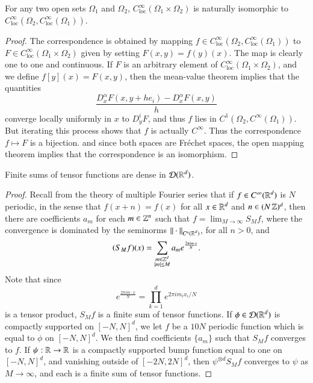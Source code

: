 \begin{theorem}
    For any two open sets $\Omega_1$ and $\Omega_2$, $C^\infty_{\text{loc}}(\Omega_1 \times \Omega_2)$ is naturally isomorphic to $C^\infty_{\text{loc}}(\Omega_2, C^\infty_{\text{loc}}(\Omega_1))$.
\end{theorem}
\begin{proof}
    The correspondence is obtained by mapping $f \in C^\infty_{\text{loc}}(\Omega_2, C^\infty_{\text{loc}}(\Omega_1))$ to $F \in C^\infty_{\text{loc}}(\Omega_1 \times \Omega_2)$ given by setting $F(x,y) = f(y)(x)$. The map is clearly one to one and continuous. If $F$ is an arbitrary element of $C^\infty_{\text{loc}}(\Omega_1 \times \Omega_2)$, and we define $f[y](x) = F(x,y)$, then the mean-value theorem implies that the quantities
    \[ \frac{D^\alpha_x F(x,y + he_i) - D^\alpha_x F(x,y)}{h} \]
    converge locally uniformly in $x$ to $D_y^i F$, and thus $f$ lies in $C^1(\Omega_2, C^\infty(\Omega_1))$. But iterating this process shows that $f$ is actually $C^\infty$. Thus the correspondence $f \mapsto F$ is a bijection. and since both spaces are Fr\'{e}chet spaces, the open mapping theorem implies that the correspondence is an isomorphism.
\end{proof}

\begin{theorem}
    Finite sums of tensor functions are dense in $\operatorname{\mathcal{D}}(\operatorname{\mathbb{R}}^d)$.
\end{theorem}
\begin{proof}
    Recall from the theory of multiple Fourier series that if $f \in C^\infty(\operatorname{\mathbb{R}}^d)$ is $N$ periodic, in the sense that $f(x + n) = f(x)$ for all $x \in \operatorname{\mathbb{R}}^d$ and $n \in (N \operatorname{\mathbb{Z}})^d$, then there are coefficients $a_m$ for each $m \in \operatorname{\mathbb{Z}}^n$ such that $f = \lim_{M \to \infty} S_M f$, where the convergence is dominated by the seminorms $\| \cdot \|_{C^n(\operatorname{\mathbb{R}}^d)}$, for all $n > 0$, and
    \[ (S_M f)(x) = \sum_{\substack{m \in \operatorname{\mathbb{Z}}^d\\|m| \leq M}} a_m e^{\frac{2 \pi i m \cdot x}{N}}. \]
    Note that since
    \[ e^{\frac{2 \pi i m \cdot x}{N}} = \prod_{k = 1}^d e^{2 \pi i m_ix_i/N} \]
    is a tensor product, $S_M f$ is a finite sum of tensor functions. If $\phi \in \operatorname{\mathcal{D}}(\operatorname{\mathbb{R}}^d)$ is compactly supported on $[-N,N]^d$, we let $f$ be a $10N$ periodic function which is equal to $\phi$ on $[-N,N]^d$. We then find coefficients $\{ a_m \}$ such that $S_M f$ converges to $f$. If $\psi: \operatorname{\mathbb{R}} \to \operatorname{\mathbb{R}}$ is a compactly supported bump function equal to one on $[-N,N]^d$, and vanishing outside of $[-2N,2N]^d$, then $\psi^{\otimes d} S_M f$ converges to $\psi$ as $M \to \infty$, and each is a finite sum of tensor functions.
\end{proof}

